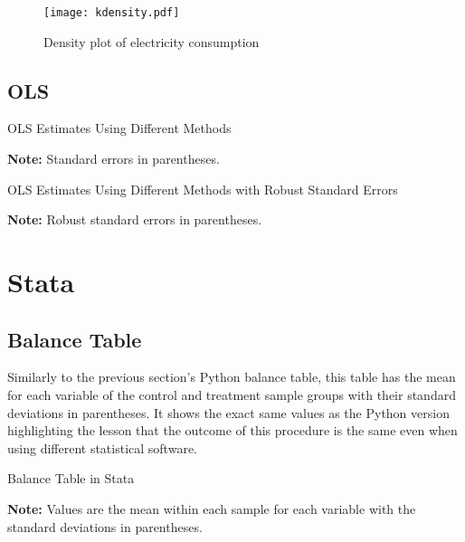 \documentclass{article}
\begin{document}
\begin{figure}[H]\centering
    \texttt{[image: kdensity.pdf]}
    \caption{Density plot of electricity consumption}
\end{figure}

\subsection{OLS}

\begin{table}[h]
    \centering
    \begin{threeparttable}
    \caption{OLS Estimates Using Different Methods}
        
        \begin{tablenotes}
          \small \item \textbf{Note:} Standard errors in parentheses. 
        \end{tablenotes}
    \end{threeparttable}
\end{table}

\begin{table}[h]
    \centering
    \begin{threeparttable}
    \caption{OLS Estimates Using Different Methods with Robust Standard Errors}
        
        \begin{tablenotes}
          \small \item \textbf{Note:} Robust standard errors in parentheses. 
        \end{tablenotes}
    \end{threeparttable}
\end{table}

\section{Stata}
\subsection{Balance Table}
Similarly to the previous section's Python balance table, this table has the mean for each variable of the control and treatment sample groups with their standard deviations in parentheses. It shows the exact same values as the Python version highlighting the lesson that the outcome of this procedure is the same even when using different statistical software.
\begin{table}[ht]
    \centering
    \begin{threeparttable}
    \caption{Balance Table in Stata}
        
        \begin{tablenotes}
          \small \item \textbf{Note:} Values are the mean within each sample for each variable with the standard deviations in parentheses. 
        \end{tablenotes}
    \end{threeparttable}
\end{table}
\end{document}
